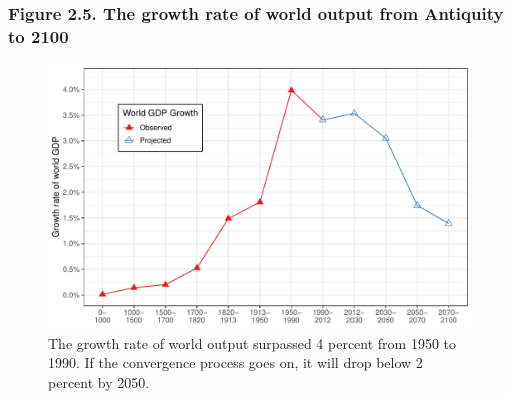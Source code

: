 \documentclass[t]{beamer}\usepackage[]{graphicx}\usepackage[]{color}
\newenvironment{knitrout}{}{} %
\begin{document}
\begin{frame}[label=Figure_2_5]
\frametitle{Figure 2.5. The growth rate of world output from Antiquity to 2100}
\begin{figure}[t]
\begin{minipage}[b]{\textwidth}
\centering
\begin{knitrout}\footnotesize
{}\color{fgcolor}

{\centering \includegraphics[width=1\linewidth]{figures/color/Figure_2_5} 

}



\end{knitrout}
\caption{The growth rate of world output surpassed 4 percent from 1950 to 1990. If the convergence process goes on, it will drop below 2 percent by 2050.}
\end{minipage}
\end{figure}
\end{frame}
\end{document}
